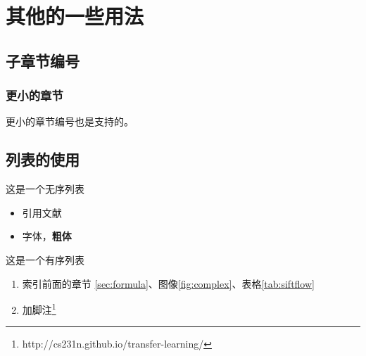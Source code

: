 \section{其他的一些用法}
\label{sec:font}
\subsection{子章节编号}
\label{sec:font:subsection}
\subsubsection{更小的章节}
\label{sec:font:subsection:subsub}
更小的章节编号也是支持的。

\subsection{列表的使用}
\label{src:font:list}

这是一个无序列表
\begin{itemize}
	\item 引用文献\cite{long2015fully}
	\item 字体{\color{red}{变红}}，\textbf{粗体}
\end{itemize}

这是一个有序列表
\begin{enumerate}
	\item 索引前面的章节 \ref{sec:formula}、图像\ref{fig:complex}、表格\ref{tab:siftflow}
	\item 加脚注\footnote{http://cs231n.github.io/transfer-learning/}
\end{enumerate}

